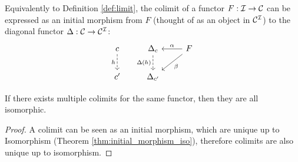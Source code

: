 \begin{definition}
	Equivalently to Definition \ref{def:limit}, the colimit of a functor $F:\mathcal{I}\to
	\mathcal{C}$ can be expressed as an initial morphism from $F$ (thought of as an object in $\mathcal{C}^{\mathcal{I}}$) to the diagonal functor $\Delta:\mathcal{C}\to\mathcal{C}^{\mathcal{I}}$:
	\[\begin{tikzcd}[ampersand replacement=\&]
		c \& {\Delta_c} \& F \\
		{c'} \& {\Delta_{c'}}
		\arrow["h"', dashed, from=1-1, to=2-1]
		\arrow["{\Delta(h)}"', dashed, from=1-2, to=2-2]
		\arrow["\beta", from=1-3, to=2-2]
		\arrow["\alpha"', from=1-3, to=1-2]
	\end{tikzcd}\]
\end{definition}

\begin{theorem}
	If there exists multiple colimits for the same functor, then they are all
	isomorphic.

	\begin{proof}
		A colimit can be seen as an initial morphism, which are unique up to
		Isomorphism (Theorem \ref{thm:initial_morphism_iso}), therefore colimits are
		also unique up to isomorphism.
	\end{proof}
\end{theorem}